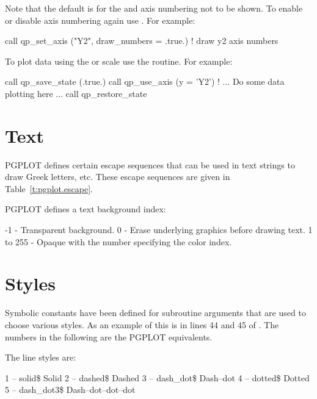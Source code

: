 Note that the default is for the  and  axis numbering
not to be shown. To enable or disable axis numbering again use
. For example:
\begin{example}
  call qp_set_axis ("Y2", draw_numbers = .true.)  ! draw y2 axis numbers
\end{example}

To plot data using the  or  scale use the
 routine. For example:
\begin{example}
  call qp_save_state (.true.)
  call qp_use_axis (y = 'Y2')
  ! ... Do some data plotting here ...
  call qp_restore_state
\end{example}

\section{Text}
\label{s:text}

PGPLOT defines certain escape sequences that can be used in text strings to draw Greek letters,
etc. These escape sequences are given in Table~\ref{t:pgplot.escape}.

PGPLOT defines a text background index:
\begin{example}
         -1 - Transparent background.
          0 - Erase underlying graphics before drawing text.
   1 to 255 - Opaque with the number specifying the color index.
\end{example}

\section{Styles}
\label{s:styles}

Symbolic constants have been defined for \quickplot subroutine arguments that are used to choose
various styles. As an example of this is in lines 44 and 45 of . The numbers in
the following are the PGPLOT equivalents.

The \quickplot line styles are:
\begin{example}
    1 -- solid\$                  Solid
    2 -- dashed\$                 Dashed
    3 -- dash_dot\$               Dash--dot 
    4 -- dotted\$                 Dotted
    5 -- dash_dot3\$              Dash--dot--dot--dot        
\end{example}

